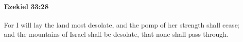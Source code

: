 
		\paragraph{Ezekiel 33:28} %
			\label{EZEKIEL-33-28}

			For I will lay the land most desolate, and the pomp of her strength shall cease; and the mountains of Israel shall be desolate, that none shall pass through.


